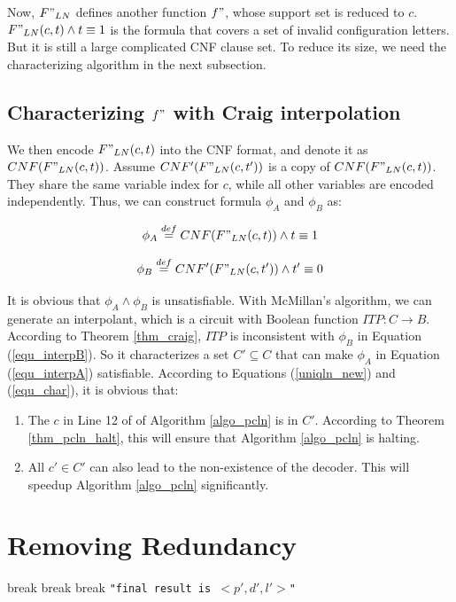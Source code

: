 \documentclass{acm_proc_article-sp}
\begin{document}
Now,
$F"_{LN}$ defines another function $f"$,
whose support set is reduced to $c$.
$F"_{LN}(c,t)\wedge t\equiv 1$ is the formula that covers a set of invalid configuration letters.
But it is still a large complicated CNF clause set.
To reduce its size,
we need the characterizing algorithm in the next subsection.

\subsection{Characterizing $f"$ with Craig interpolation}

We then encode $F"_{LN}(c,t)$ into the CNF format,
and denote it as $CNF(F"_{LN}(c,t))$.
Assume $CNF'(F"_{LN}(c,t'))$ is a copy of $CNF(F"_{LN}(c,t))$.
They share the same variable index for $c$,
while all other variables are encoded independently.
Thus,
we can construct formula $\phi_A$ and $\phi_B$ as:

\begin{equation}\label{equ_interpA}
\phi_A\stackrel{def}{=}CNF(F"_{LN}(c,t))\wedge t\equiv 1
\end{equation}

\begin{equation}\label{equ_interpB}
\phi_B\stackrel{def}{=}CNF'(F"_{LN}(c,t'))\wedge t'\equiv 0
\end{equation}

It is obvious that $\phi_A\wedge \phi_B$ is unsatisfiable.
With McMillan's algorithm\cite{interp_McMillan},
we can generate an interpolant,
which is a circuit with Boolean function $ITP:C\to B$.
According to Theorem \ref{thm_craig},
$ITP$ is inconsistent with $\phi_B$ in Equation (\ref{equ_interpB}).
So it characterizes a set $C'\subseteq C$ that can make $\phi_A$ in Equation (\ref{equ_interpA}) satisfiable.
According to Equations (\ref{uniqln_new}) and (\ref{equ_char}),
it is obvious that:
\begin{enumerate}
 \item The $c$ in Line 12 of of Algorithm \ref{algo_pcln} is in $C'$.
According to Theorem \ref{thm_pcln_halt},
this will ensure that Algorithm \ref{algo_pcln} is halting.
 \item All $c'\in C'$ can also lead to the non-existence of the decoder.
This will speedup Algorithm \ref{algo_pcln} significantly.
\end{enumerate}

\section{Removing Redundancy}\label{sec_rmred}
\begin{algorithm}
\caption{$RemoveRedundancy(p,d,l,R)$}
\label{algo_remove}
\begin{algorithmic}[1]
    \STATE break
  \ENDIF
\ENDFOR
{}
    \STATE break
  \ENDIF
\ENDFOR
{}
    \STATE break
  \ENDIF
\ENDFOR
\PRINT \texttt{"final result is $<p',d',l'>$"}
\end{algorithmic}
\end{algorithm}
\end{document}
